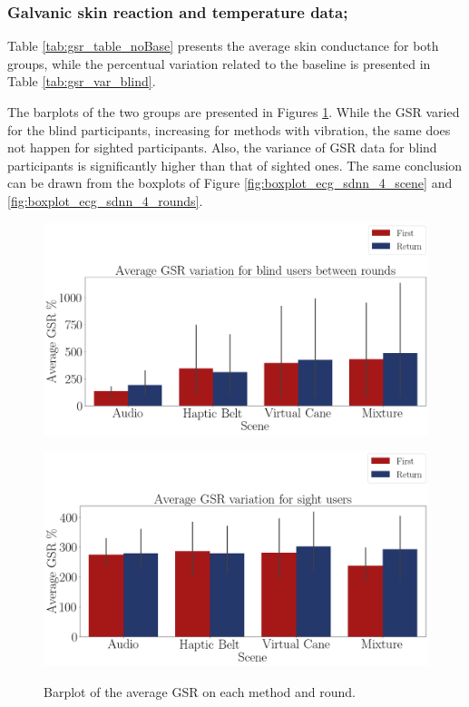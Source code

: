 \subsubsection{Galvanic skin reaction and temperature data;}
\label{subsubsec:results_gsr_temp_2}

Table \ref{tab:gsr_table_noBase} presents the average skin conductance for both groups, while the percentual variation related to the baseline is presented in Table \ref{tab:gsr_var_blind}.





The barplots of the two groups are presented in Figures \ref{fig:barplot_gsr_avg_4_scene_blind_sight}. While the GSR varied for the blind participants, increasing for methods with vibration, the same does not happen for sighted participants. Also, the variance of GSR data for blind participants is significantly higher than that of sighted ones. The same conclusion can be drawn from the boxplots of Figure \ref{fig:boxplot_ecg_sdnn_4_scene} and \ref{fig:boxplot_ecg_sdnn_4_rounds}. 

\begin{figure}[!htb]
    \centering
    \begin{minipage}{\textwidth}
        \centering
        \includegraphics[width = 0.8\linewidth]{Resultados/GSR/Figuras/png/barplot_gsr_avg_4_scene_blind.png}
        \label{fig:barplot_gsr_avg_4_scene_blind}
    \end{minipage}
    \begin{minipage}{\textwidth}
        \centering
        \includegraphics[width = 0.8\linewidth]{Resultados/GSR/Figuras/png/barplot_gsr_avg_4_scene_sight.png}
        \label{fig:barplot_gsr_avg_4_scene_sight}
    \end{minipage}
    \caption{Barplot of the average GSR on each method and round.}
    \label{fig:barplot_gsr_avg_4_scene_blind_sight}
\end{figure}

